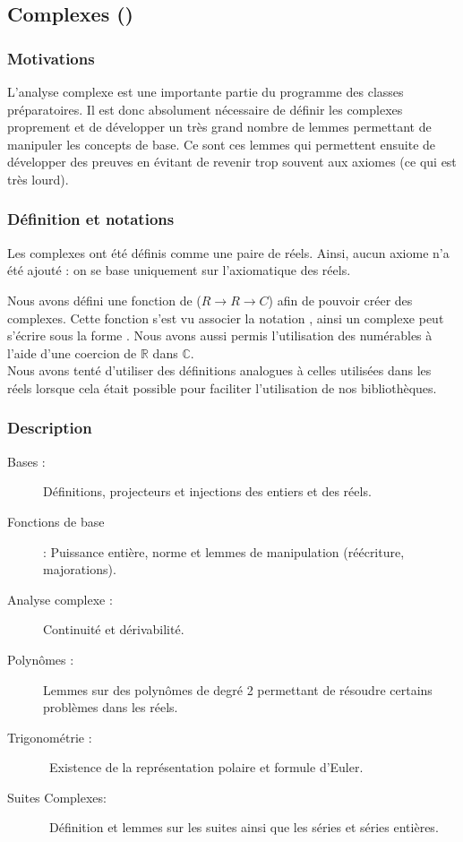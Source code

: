 \subsection{Complexes ()}


\subsubsection{Motivations}

L'analyse complexe est une importante partie du programme des classes préparatoires. Il est donc absolument nécessaire de définir les complexes proprement et de développer un très grand nombre de lemmes permettant de manipuler les concepts de base. Ce sont ces lemmes qui permettent ensuite de développer des preuves en évitant de revenir trop souvent aux axiomes (ce qui est très lourd).

\subsubsection{Définition et notations}

Les complexes ont été définis comme une paire de réels. Ainsi, aucun axiome n'a été ajouté : on se base uniquement sur l'axiomatique des réels.

Nous avons défini une fonction de ($R \rightarrow R \rightarrow C$) afin de pouvoir créer des complexes. Cette fonction s'est vu associer la notation , ainsi un complexe peut s'écrire sous la forme . Nous avons aussi permis l'utilisation des numérables à l'aide d'une coercion de $\mathbb{R}$ dans $\mathbb{C}$.\\
Nous avons tenté d'utiliser des définitions analogues à celles utilisées dans les réels lorsque cela était possible pour faciliter l'utilisation de nos bibliothèques.

\subsubsection{Description}

\begin{description}
 \item [Bases :] Définitions, projecteurs et injections des entiers et des réels.
 \item [Fonctions de base] : Puissance entière, norme et lemmes de manipulation (réécriture, majorations).
 \item [Analyse complexe :] Continuité et dérivabilité.
 \item [Polynômes :] Lemmes sur des polynômes de degré 2 permettant de résoudre certains problèmes dans les réels.
 \item [Trigonométrie :] Existence de la représentation polaire et formule d'Euler.
 \item [Suites Complexes:] Définition et lemmes sur les suites ainsi que les séries et séries entières.
\end{description}

